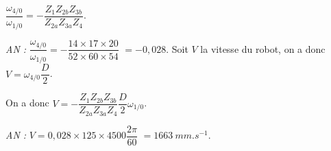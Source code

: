 \begin{corrigebox}
$\dfrac{\omega_{4/0}}{\omega_{1/0}}  = - \dfrac{Z_1 Z_{2b}Z_{3b}}{Z_{2a}Z_{3a}Z_{4}}$.

\textit{AN :} $\dfrac{\omega_{4/0}}{\omega_{1/0}}  = - \dfrac{14\times  17 \times 20}{52 \times 60 \times 54}$ $= - 0,028$.
Soit $V$ la vitesse du robot, on a donc $V = \omega_{4/0} \dfrac{D}{2}$.

On a donc $V = - \dfrac{Z_1 Z_{2b}Z_{3b}}{Z_{2a}Z_{3a}Z_{4}}  \dfrac{D}{2} \omega_{1/0}$.

\textit{AN :} $V = 0,028 \times 125 \times 4500\dfrac{2\pi}{60}$ $=\SI{1663}{mm.s^{-1}}$.
\end{corrigebox}
